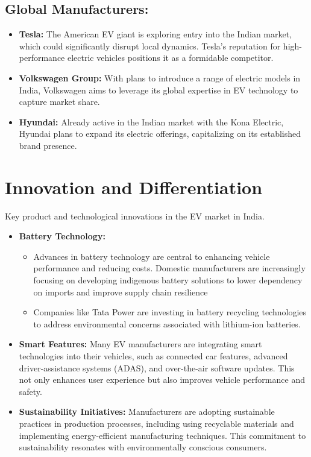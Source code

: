 \documentclass[a4paper,12pt]{report}
\begin{document}
\subsection{Global Manufacturers: }
\begin{itemize}
    \item \textbf{Tesla: }
    The American EV giant is exploring entry into the Indian market, which could significantly disrupt local dynamics. Tesla’s reputation for high-performance electric vehicles positions it as a formidable competitor.
    \item \textbf{Volkswagen Group: }
    With plans to introduce a range of electric models in India, Volkswagen aims to leverage its global expertise in EV technology to capture market share.
    \item \textbf{Hyundai: }
    Already active in the Indian market with the Kona Electric, Hyundai plans to expand its electric offerings, capitalizing on its established brand presence.
\end{itemize}

\section{Innovation and Differentiation}
Key product and technological innovations in the EV market in India.
\begin{itemize}
    \item \textbf{Battery Technology: }
    \begin{itemize}
        \item Advances in battery technology are central to enhancing vehicle performance and reducing costs. Domestic manufacturers are increasingly focusing on developing indigenous battery solutions to lower dependency on imports and improve supply chain resilience
        \item Companies like Tata Power are investing in battery recycling technologies to address environmental concerns associated with lithium-ion batteries.
    \end{itemize}
    \item \textbf{Smart Features: }
    Many EV manufacturers are integrating smart technologies into their vehicles, such as connected car features, advanced driver-assistance systems (ADAS), and over-the-air software updates. This not only enhances user experience but also improves vehicle performance and safety.
    \item \textbf{Sustainability Initiatives: }
    Manufacturers are adopting sustainable practices in production processes, including using recyclable materials and implementing energy-efficient manufacturing techniques. This commitment to sustainability resonates with environmentally conscious consumers.
\end{itemize}
\end{document}
